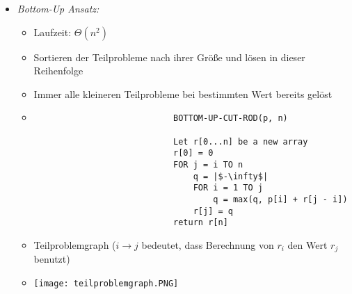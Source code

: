 \begin{itemize}
\begin{itemize}
\begin{itemize}
\begin{verbatim}
                            MEMOIZED-CUT-ROD-AUX(p, n, r)       // r new Array

                            IF r[n] |$\geq$| 0                        // Abfrage ob vorhanden
                                return r[n]
                            IF n == 0
                                q = 0
                            ELSE
                                q = |$-\infty$|
                                FOR i = 1 to n
                                q = max(q, p[i] + MEMOIZED-CUT-ROD-AUX(p, n - i, r))
                            r[n] = q                            // Abspeichern
                            return q
                            \end{verbatim}
                    \end{itemize}
\pagebreak
                \item \textit{Bottom-Up Ansatz:}
                    \begin{itemize}
                        \item Laufzeit: $\Theta(n^2)$
                        \item Sortieren der Teilprobleme nach ihrer Grö\ss e und lösen in dieser Reihenfolge
                        \item Immer alle kleineren Teilprobleme bei bestimmten Wert bereits gelöst
                        \item[]
                            \begin{verbatim}
                            BOTTOM-UP-CUT-ROD(p, n)

                            Let r[0...n] be a new array
                            r[0] = 0
                            FOR j = i TO n
                                q = |$-\infty$|
                                FOR i = 1 TO j
                                    q = max(q, p[i] + r[j - i])
                                r[j] = q
                            return r[n]
                            \end{verbatim}
                        \item Teilproblemgraph ($i \rightarrow j$ bedeutet, dass Berechnung von $r_i$ den Wert $r_j$ benutzt)
                        \item[] \texttt{[image: teilproblemgraph.PNG]}
                    \end{itemize}
            \end{itemize}


\end{itemize}
